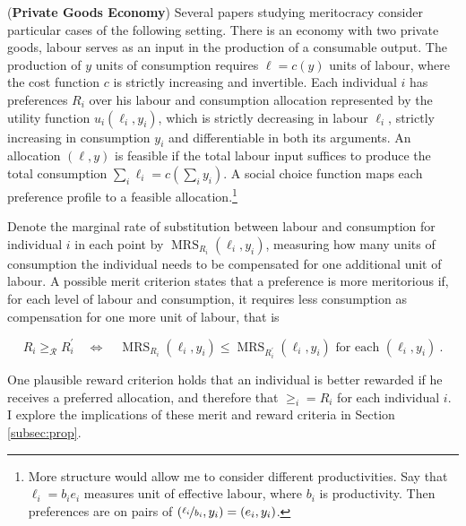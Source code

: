 \begin{example} \label{ex:priv}
	 (\textbf{Private Goods Economy}) Several papers studying meritocracy \citep{andreShallowMeritocracy2024,cappelenMeritocraticOriginEgalitarian2022,cappelenMeritPrimacyEffect2023,cappelenFairnessLimitedInformation2024,fleurbaeyFairnessResponsibilityWelfare2008} consider particular cases of the following setting. There is an economy with two private goods, labour serves as an input in the production of a consumable output. The production of \( y \) units of consumption requires \( \ell = c ( y ) \) units of labour, where the cost function \( c \) is strictly increasing and invertible. Each individual \( i \) has preferences \( R_i \) over his labour and consumption allocation represented by the utility function \( u_i ( \ell_i, y_i ) \), which is strictly decreasing in labour \( \ell_i \), strictly increasing in consumption \( y_i \) and differentiable in both its arguments. An allocation  \( ( \ell, y ) \) is feasible if the total labour input suffices to produce the total consumption \( \sum_{i} \ell_i = c  ( \sum_i y_i ) \). A social choice function maps each preference profile to a feasible allocation.\footnote{More structure would allow me to consider different productivities. Say that \( \ell_i = b_i e_i \) measures unit of effective labour, where \( b_i \) is productivity. Then preferences are on pairs of \( ( \nicefrac{\ell_i}{b_i}, y_i ) = ( e_i, y_i ) \).}

	Denote the marginal rate of substitution between labour and consumption for individual \( i \) in each point by \( \operatorname{MRS}_{R_i} ( \ell_i, y_i ) \), measuring how many units of consumption the individual needs to be compensated for one additional unit of labour. A possible merit criterion states that a preference is more meritorious if, for each level of labour and consumption, it requires less consumption as compensation for one more unit of labour, that is

	\[ R_i \geq_{\mathcal{R}} R_i^{\prime} \quad \Longleftrightarrow \quad \operatorname{MRS}_{R_i} ( \ell_i, y_i ) \leq \operatorname{MRS}_{R^{\prime}_i} ( \ell_i, y_i ) \text{ for each } ( \ell_i, y_i ) \: .\]

	One plausible reward criterion holds that an individual is better rewarded if he receives a preferred allocation, and therefore that \( \geq_i = R_i \) for each individual \( i \). I explore the implications of these merit and reward criteria in Section \ref{subsec:prop}.
\end{example}

